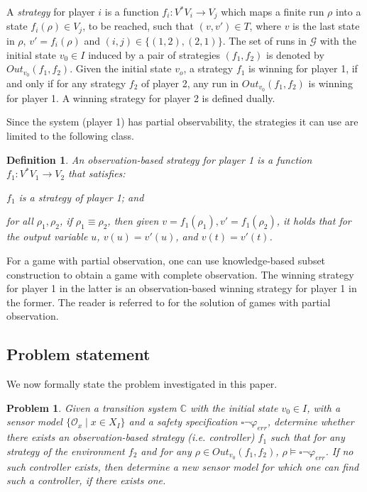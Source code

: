 \documentclass[letterpaper, 10 pt, conference]{ieeeconf}
\newtheorem{definition}{Definition}
\newtheorem{problem}{Problem}
\begin{document}
A \emph{strategy} for player $i$ is a function $f_i:V^\ast V_i
\rightarrow V_j$ which maps a finite run $\rho$ into a state
$f_i(\rho) \in V_j$, to be reached, such that $(v,v') \in T$, where $v$ is the last
state in $\rho$, $v' = f_i(\rho)$ and $(i,j)
\in\{(1,2), (2,1)\}$. The set of runs in $\mathcal{G}$ with the
initial state $v_0\in I$ induced by a pair of strategies $(f_1,f_2)$
is denoted by $Out_{v_0}(f_1,f_2)$.  Given the initial state $v_o$, a
strategy $f_1$ is winning for player 1, if and only if for any
strategy $f_2$ of player 2, any run in $Out_{v_0}(f_1,f_2)$ is winning
for player 1. A winning strategy for player 2 is defined dually.

Since the system (player 1) has partial observability, the strategies
it can use are limited to the following class.
\begin{definition}
  An \emph{observation-based} strategy for player 1 is a function
  $f_1: V^\ast V_1 \rightarrow V_2$ that satisfies: \begin{inparaenum}[(1)]
\item $f_1$ is a strategy of player 1; and 
\item for all $\rho_1,\rho_2$, if $\rho_1\equiv \rho_2$, then given
  $v= f_1(\rho_1), v'= f_1(\rho_2)$, it holds that for the output variable $u $, $v(u)=
  v'(u)$, and $v(t)=v'(t)$.
\end{inparaenum}
\end{definition}
For a game with partial observation, one can use knowledge-based subset
construction to obtain a game with complete observation. The winning
strategy for player 1 in the latter is an observation-based winning
strategy for player 1 in the former. The reader is referred to
\cite{chatterjee2006algorithm} for the solution of games with partial observation.
\subsection{Problem statement}
\noindent
We now formally state the problem investigated in this paper.
\begin{problem}
  Given a transition system $\mathbb{C}$ with the initial state $v_0
  \in I$, with a sensor model $\{\mathcal{O}_x \mid x\in X_I\}$ and
  a safety specification $\square \neg \varphi_{err}$, determine
  whether there exists an observation-based strategy (i.e. controller)
  $f_1$ such that for any strategy of the environment $f_2$ and for
  any $\rho \in Out_{v_0}(f_1,f_2)$, $\rho \models \square \neg
  \varphi_{err}$. If no such controller exists, then determine a new
  sensor model for which one can find such a controller, if there
  exists one.
\end{problem}
\end{document}
